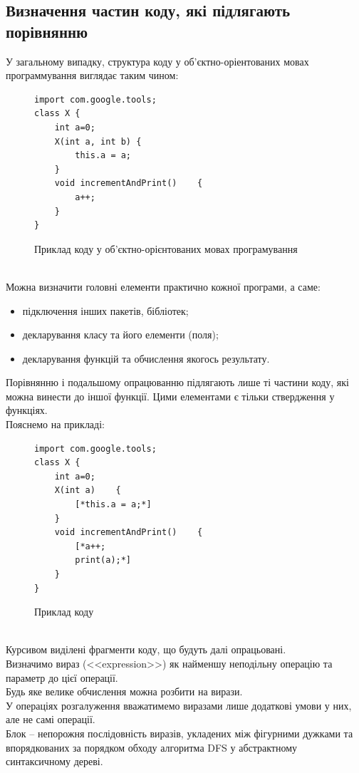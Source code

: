 \documentclass[a4paper, 14pt]{article}
\begin{document}
\subsection{Визначення частин коду, які підлягають порівнянню}
У загальному випадку, структура коду у об'єктно-оріентованих мовах программування виглядає таким чином: \\
\begin{figure}[h!]
\begin{lstlisting}[frame=none, xleftmargin=.3\textwidth]
import com.google.tools;
class X {
	int a=0;
	X(int a, int b)	{
		this.a = a;
	}
	void incrementAndPrint()	{
		a++;
	}
}
\end{lstlisting}
\caption{Приклад коду у об'єктно-орієнтованих мовах програмування}
\end{figure} \\
Можна визначити головні елементи практично кожної програми, а саме:
\begin{itemize}
\item підключення інших пакетів, бібліотек;
\item декларування класу та його елементи (поля);
\item декларування функцій та обчислення якогось результату.
\end{itemize}
Порівнянню і подальшому опрацюванню підлягають лише ті частини коду, які можна винести до іншої функції.
Цими елементами є тільки ствердження у функціях.\\
Пояснемо на прикладі: \\
\begin{figure}[h!]
\begin{lstlisting}[frame=none, xleftmargin=.3\textwidth]
import com.google.tools;
class X {
	int a=0;
	X(int a)	{
		[*this.a = a;*]
	}
	void incrementAndPrint()	{
		[*a++;
		print(a);*]
	}
}
\end{lstlisting}
\caption{Приклад коду}
\end{figure} \\
Курсивом виділені фрагменти коду, що будуть далі опрацьовані. \\
Визначимо вираз (<<expression>>) як найменшу неподільну операцію та параметр до цієї операції. \\ Будь яке велике обчислення можна розбити на вирази. \\
У операціях розгалуження вважатимемо виразами лише додаткові умови у них, але не самі операції. \\
Блок -- непорожня послідовність виразів, укладених між фігурними дужками та впорядкованих за порядком обходу алгоритма DFS у абстрактному синтаксичному дереві. \\
\end{document}
